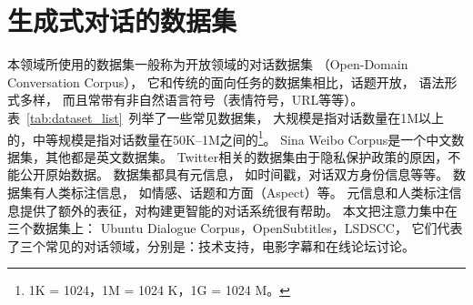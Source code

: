 \section{生成式对话的数据集}\label{sec:public_dataset}
本领域所使用的数据集一般称为开放领域的对话数据集
（Open-Domain Conversation Corpus），
它和传统的面向任务的数据集相比，话题开放， 语法形式多样，
而且常带有非自然语言符号（表情符号，URL等等）。
表~\ref{tab:dataset_list}~列举了一些常见数据集，
大规模是指对话数量在1M以上的，中等规模是指对话数量在50K--1M之间的\footnote{1K = 1024，1M = 1024 K，1G = 1024 M。}。
Sina Weibo Corpus是一个中文数据集，其他都是英文数据集。
Twitter相关的数据集由于隐私保护政策的原因，不能公开原始数据。
数据集都具有元信息，
如时间戳，对话双方身份信息等等。
数据集有人类标注信息，
如情感、话题和方面（Aspect）等。
元信息和人类标注信息提供了额外的表征，对构建更智能的对话系统很有帮助。
本文把注意力集中在三个数据集上：
Ubuntu Dialogue Corpus，OpenSubtitles，LSDSCC，
它们代表了三个常见的对话领域，分别是：技术支持，电影字幕和在线论坛讨论。

